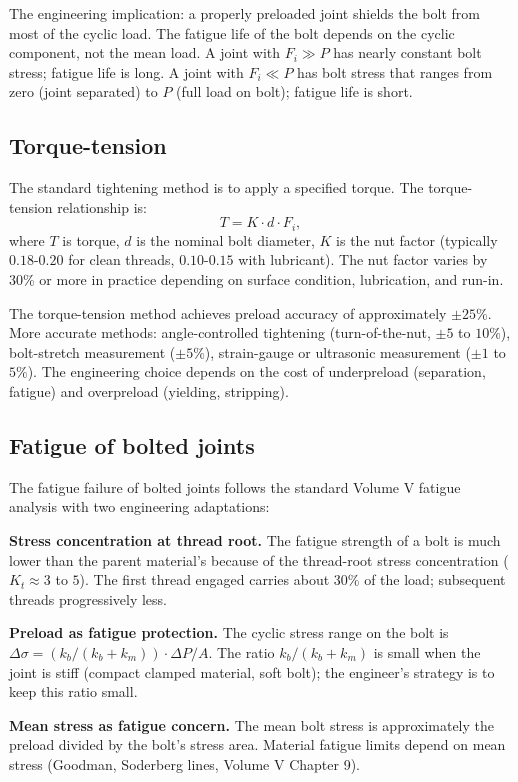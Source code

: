 The engineering implication: a properly preloaded joint shields the bolt from most of the cyclic load. The fatigue life of the bolt depends on the cyclic component, not the mean load. A joint with $F_i \gg P$ has nearly constant bolt stress; fatigue life is long. A joint with $F_i \ll P$ has bolt stress that ranges from zero (joint separated) to $P$ (full load on bolt); fatigue life is short.

\subsection{Torque-tension}

The standard tightening method is to apply a specified torque. The torque-tension relationship is:
\[
T = K \cdot d \cdot F_i,
\]
where $T$ is torque, $d$ is the nominal bolt diameter, $K$ is the nut factor (typically $0.18$-$0.20$ for clean threads, $0.10$-$0.15$ with lubricant). The nut factor varies by 30\% or more in practice depending on surface condition, lubrication, and run-in.

The torque-tension method achieves preload accuracy of approximately $\pm 25\%$. More accurate methods: angle-controlled tightening (turn-of-the-nut, $\pm 5$ to $10\%$), bolt-stretch measurement ($\pm 5\%$), strain-gauge or ultrasonic measurement ($\pm 1$ to $5\%$). The engineering choice depends on the cost of underpreload (separation, fatigue) and overpreload (yielding, stripping).

\subsection{Fatigue of bolted joints}

The fatigue failure of bolted joints follows the standard Volume V fatigue analysis with two engineering adaptations:

\textbf{Stress concentration at thread root.} The fatigue strength of a bolt is much lower than the parent material's because of the thread-root stress concentration ($K_t \approx 3$ to $5$). The first thread engaged carries about 30\% of the load; subsequent threads progressively less.

\textbf{Preload as fatigue protection.} The cyclic stress range on the bolt is $\Delta \sigma = (k_b/(k_b + k_m)) \cdot \Delta P / A$. The ratio $k_b/(k_b + k_m)$ is small when the joint is stiff (compact clamped material, soft bolt); the engineer's strategy is to keep this ratio small.

\textbf{Mean stress as fatigue concern.} The mean bolt stress is approximately the preload divided by the bolt's stress area. Material fatigue limits depend on mean stress (Goodman, Soderberg lines, Volume V Chapter 9).

